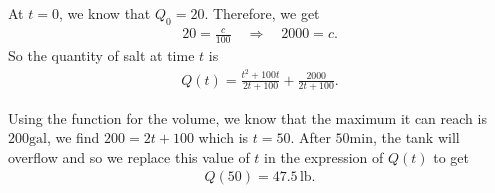 \documentclass[12pt]{article}
\newcommand{\Ra}{\Rightarrow}
\begin{document}
	At $t = 0$, we know that $Q_0 = 20$. Therefore, we get
		\begin{align*}
		20 = \frac{c}{100} \quad \Ra \quad 2000 = c .
		\end{align*}	
	So the quantity of salt at time $t$ is
		\begin{align*}
		Q(t) = \frac{t^2 + 100t}{2t + 100} + \frac{2000}{2t + 100} .
		\end{align*}
	
	Using the function for the volume, we know that the maximum it can reach is $200\mathrm{gal}$, we find $200 = 2t + 100$ which is $t = 50$. After $50\mathrm{min}$, the tank will overflow and so we replace this value of $t$ in the expression of $Q(t)$ to get
		\begin{align*}
		Q(50) = 47.5\, \mathrm{lb} .
		\end{align*}							 
	
\end{document}
